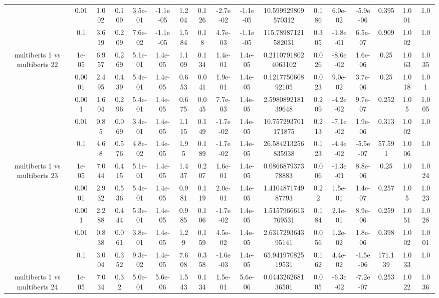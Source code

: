 \begin{tabular}{|c|c|c|c|c|c|c|c|c|c|c|c|c|c|c|c|c|}
 & 0.01 & 1.002 & 0.109 & 3.5e-01 & -1.1e-05 & 1.204 & 0.126 & -2.7e-02 & -1.1e-05 & 10.599929809570312 & 0.186 & 6.0e-02 & -5.9e-06 & 0.395 & 1.001 & 1.0 \\
 & 0.1 & 3.619 & 0.209 & 7.6e-02 & -1.1e-05 & 1.584 & 0.18 & 4.7e-03 & -1.1e-05 & 115.78987121582031 & 0.305 & -1.8e-01 & 6.5e-07 & 0.909 & 1.002 & 1.0 \\
\hline
\multirow{5}{*}{multiberts 1 vs multiberts 22} & 1e-05 & 6.957 & 0.269 & 5.1e-01 & 1.4e-05 & 1.109 & 0.134 & 1.4e-01 & 1.4e-05 & 0.21107918024063102 & 0.026 & -8.6e-02 & 1.6e-06 & 0.25 & 1.063 & 1.035 \\
 & 0.0001 & 2.495 & 0.439 & 5.4e-01 & 1.4e-05 & 0.653 & 0.041 & 1.9e-01 & 1.4e-05 & 0.121775060892105 & 0.023 & 9.0e-02 & 3.7e-06 & 0.25 & 1.018 & 1.01 \\
 & 0.001 & 1.604 & 0.296 & 5.4e-01 & 1.4e-05 & 0.675 & 0.045 & 7.7e-03 & 1.4e-05 & 2.598089218139648 & 0.209 & -4.2e-02 & 9.7e-07 & 0.252 & 1.05 & 1.005 \\
 & 0.01 & 0.85 & 0.069 & 3.4e-01 & 1.4e-05 & 1.115 & 0.149 & -1.7e-02 & 1.4e-05 & 10.757293701171875 & 0.213 & -7.1e-02 & 1.9e-06 & 0.313 & 1.002 & 1.0 \\
 & 0.1 & 4.68 & 0.576 & 4.8e-02 & 1.4e-05 & 1.95 & 0.189 & -1.7e-02 & 1.4e-05 & 26.584213256835938 & 0.123 & -4.4e-02 & -5.5e-07 & 57.591 & 1.006 & 1.0 \\
\hline
\multirow{5}{*}{multiberts 1 vs multiberts 23} & 1e-05 & 7.044 & 0.415 & 5.1e-01 & 1.4e-05 & 1.437 & 0.207 & 1.6e-01 & 1.4e-05 & 0.086687937378883 & 0.006 & -1.3e-01 & 8.8e-06 & 0.25 & 1.0 & 1.024 \\
 & 0.0001 & 2.932 & 0.536 & 5.4e-01 & 1.4e-05 & 0.981 & 0.119 & 2.0e-01 & 1.4e-05 & 1.410487174987793 & 0.22 & 1.5e-01 & 1.4e-07 & 0.257 & 1.05 & 1.023 \\
 & 0.001 & 2.288 & 0.444 & 5.3e-01 & 1.4e-05 & 0.985 & 0.106 & -1.7e-02 & 1.4e-05 & 1.5157966613769531 & 0.184 & 2.1e-01 & 8.9e-06 & 0.259 & 1.051 & 1.028 \\
 & 0.01 & 0.838 & 0.061 & 3.8e-01 & 1.4e-05 & 1.29 & 0.159 & 4.5e-02 & 1.4e-05 & 2.631729364395141 & 0.056 & 1.2e-02 & 1.8e-06 & 0.398 & 1.002 & 1.001 \\
 & 0.1 & 3.004 & 0.352 & 9.3e-02 & 1.4e-05 & 7.608 & 0.358 & -1.6e-03 & 1.4e-05 & 65.94197082519531 & 0.162 & 4.4e-02 & -1.5e-06 & 171.139 & 1.033 & 1.0 \\
\hline
\multirow{5}{*}{multiberts 1 vs multiberts 24} & 1e-05 & 7.034 & 0.32 & 5.0e-01 & 5.6e-06 & 1.543 & 0.134 & 1.5e-01 & 5.6e-06 & 0.044326268136501 & 0.005 & -6.3e-02 & -7.2e-07 & 0.253 & 1.022 & 1.036 \\

\end{tabular}
